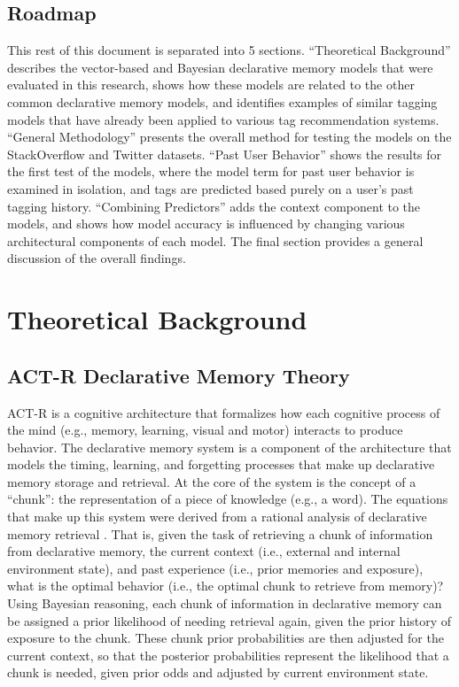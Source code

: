 \documentclass[man,floatsintext,donotrepeattitle]{apa6}
\begin{document}
\subsection{Roadmap}

This rest of this document is separated into 5 sections.
``Theoretical Background'' describes the vector-based and Bayesian declarative memory models that were evaluated in this research,
shows how these models are related to the other common declarative memory models,
and identifies examples of similar tagging models that have already been applied to various tag recommendation systems.
``General Methodology'' presents the overall method for testing the models on the StackOverflow and Twitter datasets.
``Past User Behavior'' shows the results for the first test of the models, where the model term for past user behavior is examined in isolation, and tags are predicted based purely on a user's past tagging history.
``Combining Predictors'' adds the context component to the models, and shows how model accuracy is influenced by changing various architectural components of each model.
The final section provides a general discussion of the overall findings.

\section{Theoretical Background}

\subsection{ACT-R Declarative Memory Theory}

ACT-R \parencite{Anderson2007} is a cognitive architecture that formalizes how each cognitive process of the mind (e.g., memory, learning, visual and motor) interacts to produce behavior.
The declarative memory system is a component of the architecture that models the timing, learning, and forgetting processes that make up declarative memory storage and retrieval.
At the core of the system is the concept of a ``chunk'': the representation of a piece of knowledge (e.g., a word).
The equations that make up this system were derived from a rational analysis of declarative memory retrieval \parencite{Anderson1989}.
That is, given the task of retrieving a chunk of information from declarative memory,
the current context (i.e., external and internal environment state), and past experience (i.e., prior memories and exposure), 
what is the optimal behavior (i.e., the optimal chunk to retrieve from memory)?
Using Bayesian reasoning, each chunk of information in declarative memory can be assigned a prior likelihood of needing retrieval again, given the prior history of exposure to the chunk.
These chunk prior probabilities are then adjusted for the current context, so that the posterior probabilities represent the likelihood that a chunk is needed, given prior odds and adjusted by current environment state.
\end{document}
